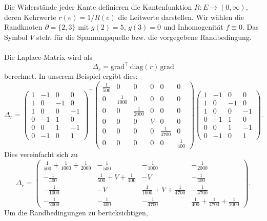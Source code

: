 \documentclass[11pt,a4paper,leqno]{report}
\numberwithin{equation}{chapter}
\begin{document}
\noindent
Die Widerstände jeder Kante definieren die Kantenfunktion $R:E\to (0,\infty)$, 
deren Kehrwerte $r(e)=1/R(e)$ die Leitwerte darstellen. 
Wir wählen die Randknoten $\partial=\{2,3\}$ mit $g(2)=5$, $g(3)=0$ 
und Inhomogenität $f\equiv 0$. 
Das Symbol $V$ steht für die Spannungsquelle bzw. die vorgegebene Randbedingung.
\\
\\
Die Laplace-Matrix wird als
\[
\Delta_r = \mathrm{grad}^\top \, \mathrm{diag}(r) \, \mathrm{grad}
\]
berechnet. In unserem Beispiel ergibt dies:
\[
\Delta_r = 
\begin{pmatrix}
	1 & -1 & 0 & 0\\
	1 & 0 & -1 & 0\\
	1 & 0 & 0 & -1\\
	0 & -1 & 1 & 0\\
	0 & 0 & 1 & -1\\
	0 & -1 & 0 & 1
\end{pmatrix}^{\!\top}
\begin{pmatrix}
	\frac{1}{500} & 0 & 0 & 0 & 0 & 0\\
	0 & \frac{1}{1000} & 0 & 0 & 0 & 0\\
	0 & 0 & \frac{1}{2000} & 0 & 0 & 0\\
	0 & 0 & 0 & V & 0 & 0\\
	0 & 0 & 0 & 0 & \frac{1}{4700} & 0\\
	0 & 0 & 0 & 0 & 0 & \frac{1}{400}
\end{pmatrix}
\begin{pmatrix}
	1 & -1 & 0 & 0\\
	1 & 0 & -1 & 0\\
	1 & 0 & 0 & -1\\
	0 & -1 & 1 & 0\\
	0 & 0 & 1 & -1\\
	0 & -1 & 0 & 1
\end{pmatrix}.
\]
Dies vereinfacht sich zu
\[
\Delta_r =
\begin{pmatrix}
	\frac{1}{500}+\frac{1}{1000}+\frac{1}{2000} & -\tfrac{1}{500} & -\tfrac{1}{1000} & -\tfrac{1}{2000}\\[6pt]
	-\tfrac{1}{500} & \frac{1}{500}+V+\tfrac{1}{400} & -V & -\tfrac{1}{400}\\[6pt]
	-\tfrac{1}{1000} & -V & \frac{1}{1000}+V+\tfrac{1}{4700} & -\tfrac{1}{4700}\\[6pt]
	-\tfrac{1}{2000} & -\tfrac{1}{400} & -\tfrac{1}{4700} & \tfrac{1}{400}+\tfrac{1}{4700}+\tfrac{1}{2000}
\end{pmatrix}.
\]
Um die Randbedingungen zu berücksichtigen, 
\end{document}
